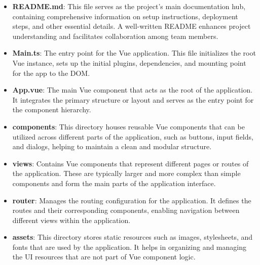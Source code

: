 \begin{itemize}
    \item \textbf{README.md}: This file serves as the project's main documentation hub, containing comprehensive information on setup instructions, deployment steps, and other essential details. A well-written README enhances project understanding and facilitates collaboration among team members.

    \item \textbf{Main.ts}: The entry point for the Vue application. This file initializes the root Vue instance, sets up the initial plugins, dependencies, and mounting point for the app to the DOM.

    \item \textbf{App.vue}: The main Vue component that acts as the root of the application. It integrates the primary structure or layout and serves as the entry point for the component hierarchy.

    \item \textbf{components}: This directory houses reusable Vue components that can be utilized across different parts of the application, such as buttons, input fields, and dialogs, helping to maintain a clean and modular structure.

    \item \textbf{views}: Contains Vue components that represent different pages or routes of the application. These are typically larger and more complex than simple components and form the main parts of the application interface.

    \item \textbf{router}: Manages the routing configuration for the application. It defines the routes and their corresponding components, enabling navigation between different views within the application.

    \item \textbf{assets}: This directory stores static resources such as images, stylesheets, and fonts that are used by the application. It helps in organizing and managing the UI resources that are not part of Vue component logic.
\end{itemize}

